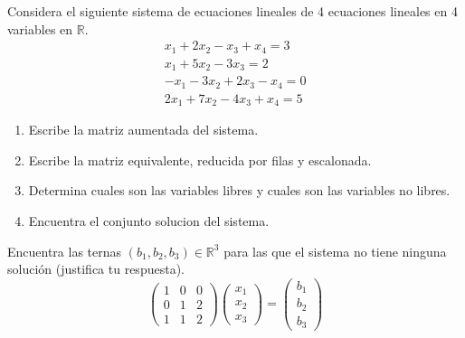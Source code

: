 \documentclass[12pt,a4paper]{book}
\begin{document}
    \begin{ejercicio}
        Considera el siguiente sistema de ecuaciones lineales de 4
        ecuaciones lineales en 4 variables en $\mathbb{R}$.
        \begin{equation*}
            \begin{matrix}
                x_{1}+2x_{2}-x_{3}+x_{4}=3\\
                x_{1}+5x_{2}-3x_{3}=2\\
                -x_{1}-3x_{2}+2x_{3}-x_{4}=0\\
                2x_{1}+7x_{2}-4x_{3}+x_{4}=5
            \end{matrix}
        \end{equation*}
        \begin{enumerate}
            \item[(a)] Escribe la matriz aumentada del sistema.
            \item[(b)] Escribe la matriz equivalente, reducida por filas y escalonada.
            \item[(c)] Determina cuales son las variables libres y cuales son las variables no libres.
            \item[(d)] Encuentra el conjunto solucion del sistema.  
        \end{enumerate}
    \end{ejercicio}

    \begin{ejercicio}
        Encuentra las ternas $(b_{1},b_{2},b_{3})\in\mathbb{R}^{3}$ para las que
        el sistema no tiene ninguna solución (justifica tu respuesta).
        \begin{equation*}
            \begin{pmatrix}
                1 & 0 & 0\\
                0 & 1 & 2\\
                1 & 1 & 2
            \end{pmatrix}
            \begin{pmatrix}
                x_{1}\\
                x_{2}\\
                x_{3}
            \end{pmatrix}
            =
            \begin{pmatrix}
                b_{1}\\
                b_{2}\\
                b_{3}
            \end{pmatrix}
        \end{equation*}
    \end{ejercicio}
\end{document}
